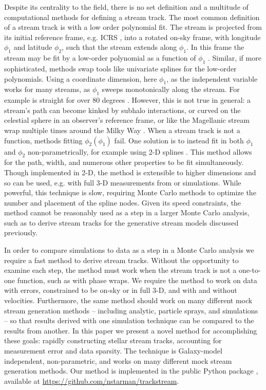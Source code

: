 \documentclass[fleqn,usenatbib]{mnras}
\begin{document}
  Despite its centrality to the field, there is no set definition and a
  multitude of computational methods for defining a stream track. The most
  common definition of a stream track is with a low order polynomial fit. The
  stream is projected from its initial reference frame, e.g. ICRS
  \citep{ICRS1997}, into a rotated on-sky frame, with longitude $\phi_1$ and
  latitude $\phi_2$, such that the stream extends along $\phi_1$. In this frame
  the stream may be fit by a low-order polynomial as a function of $\phi_1$
  \citep[e.g.][]{Bonaca2020}. Similar, if more sophisticated, methods swap tools
  like univariate splines \citep[e.g.][]{Erkal2017, Bonaca2018} for the
  low-order polynomials. Using a coordinate dimension, here $\phi_1$, as the
  independent variable works for many streams, as $\phi_1$ sweeps monotonically
  along the stream. For example  is straight for over 80 degrees
  \citep{Webb2019, Price-Whelan2018}. However, this is not true in general: a
  stream's path can become kinked by subhalo interactions, or curved on the
  celestial sphere in an observer's reference frame, or like the Magellanic
  stream wrap multiple times around the Milky Way \citep{Wannier1972}. When a
  stream track is not a function, methods fitting $\phi_2(\phi_1)$ fail. One
  solution is to instead fit in both $\phi_1$ and $\phi_2$ non-parametrically,
  for example using 2-D splines \citep{Erkal2017,Koposov2019, Li2021,
  Tavangar2022}. This method allows for the path, width, and numerous other
  properties to be fit simultaneously. Though implemented in 2-D, the method is
  extensible to higher dimensions and so can be used, e.g. with full 3-D
  measurements from \gaia{} or simulations. While powerful, this technique is
  slow, requiring Monte Carlo methods to optimize the number and placement of
  the spline nodes. Given its speed constraints, the method cannot be reasonably
  used as a step in a larger Monte Carlo analysis, such as to derive stream
  tracks for the generative stream models discussed previously.
  
  In order to compare simulations to data as a step in a Monte Carlo analysis we
  require a fast method to derive stream tracks. Without the opportunity to
  examine each step, the method must work when the stream track is not a
  one-to-one function, such as with phase wraps. We require the method to work
  on data with errors, constrained to be on-sky or in full 3-D, and with and
  without velocities. Furthermore, the same method should work on many different
  mock stream generation methods -- including analytic, particle sprays, and
  \nbody{} simulations -- so that results derived with one simulation technique
  can be compared to the results from another. In this paper we present a novel
  method for accomplishing these goals: rapidly constructing stellar stream
  tracks, accounting for measurement error and data sparsity. The technique is
  Galaxy-model independent, non-parametric, and works on many different mock
  stream generation methods. Our method is implemented in the public Python
  package \trackstream{}, available at
  \url{https://github.com/nstarman/trackstream}. 
\end{document}
